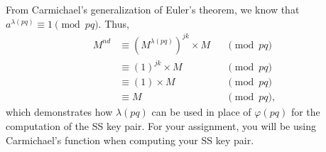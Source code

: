 From Carmichael's generalization of Euler's theorem, we know that
$a^{\lambda(pq)} \equiv 1 \pmod{pq}$. Thus,
\begin{align*}
  M^{n d} &\equiv (M^{\lambda(pq)})^{jk} \times M &&\pmod{pq} \\
          &\equiv (1)^{jk} \times M  &&\pmod{pq} \\
          &\equiv (1) \times M  &&\pmod{pq} \\
          &\equiv M  &&\pmod{pq},
\end{align*}
which demonstrates how $\lambda(pq)$ can be used in place of $\varphi(pq)$ for the
computation of the SS key pair. For your assignment, you will be using
Carmichael's function when computing your SS key pair.
